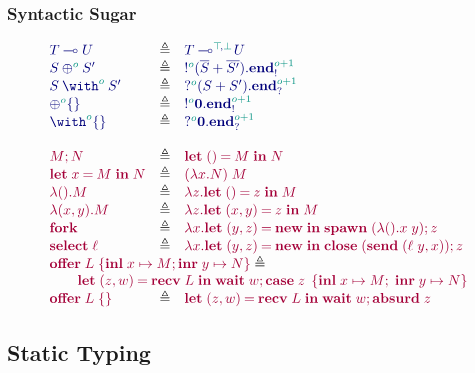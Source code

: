 \documentclass[main.tex]{subfiles}
\begin{document}
\subsubsection{Syntactic Sugar}%
\label{sec:pgv-syntax-sugar}

\[
\begin{array}{lcl}
  \ty{\tylolli{T}{U}}
  & \elabarrow & \ty{\tylolli[\cs{\ptop},\cs{\pbot}]{T}{U}} \\
  \ty{\tyselect[\cs{o}]{S}{S'}}
  & \elabarrow & \ty{\tysend[\cs{o}]{(\tysum{\co{S}}{\co{S'}})}{\tyends[\cs{o+1}]}} \\
  \ty{\tyoffer[\cs{o}]{S}{S'}}
  & \elabarrow & \ty{\tyrecv[\cs{o}]{(\tysum{S}{S'})}{\tyendr[\cs{o+1}]}} \\
  \ty{\tyselectemp[\cs{o}]}
  & \elabarrow & \ty{\tysend[\cs{o}]{\tyvoid}{\tyends[\cs{o+1}]}} \\
  \ty{\tyofferemp[\cs{o}]}
  & \elabarrow & \ty{\tyrecv[\cs{o}]{\tyvoid}{\tyendr[\cs{o+1}]}} \\
  \\
  \tm{\andthen{M}{N}}
  & \elabarrow & \tm{\letunit{M}{N}} \\
  \tm{\letbind{x}{M}{N}}
  & \elabarrow & \tm{(\lambda x.N)\;M} \\
  \tm{\lambda\unit.M}
  & \elabarrow & \tm{\lambda z.\letunit{z}{M}} \\
  \tm{\lambda\pair{x}{y}.M}
  & \elabarrow & \tm{\lambda z.\letpair{x}{y}{z}{M}} \\
  \tm{\fork}
  & \elabarrow & \tm{\lambda x.\letpair{y}{z}{\new}{\andthen{\spawn\;{(\lambda\unit.x\;y)}}{z}}} \\
  \tm{\select{\ell}}
  & \elabarrow & \tm{\lambda x.\letpair{y}{z}{\new}{\andthen{\close\;(\send\;{\pair{\ell\;y}{x}})}{z}}} \\
  \multicolumn{3}{l}{\tm{\offer{L}{x}{M}{y}{N}}\elabarrow} \\
  \multicolumn{3}{l}{
  \qquad\tm{\letpair{z}{w}{\recv\;{L}}{\andthen{\wait\;{w}}{\casesum{z}{x}{M}{y}{N}}}}} \\
  \tm{\offeremp{L}}
  & \elabarrow & \tm{\letpair{z}{w}{\recv\;L}{\andthen{\wait\;{w}}{\absurd{z}}}}
\end{array}
\]

\subsection{Static Typing}%
\label{sec:pgv-typing-static}
\end{document}
